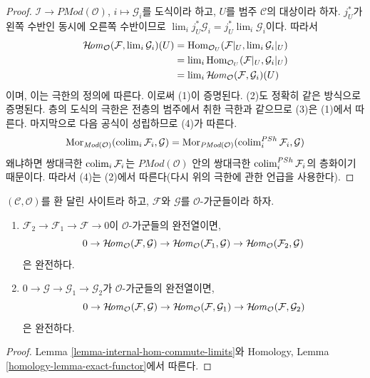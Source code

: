 \begin{proof}
$\mathcal{I} \to \textit{PMod}(\mathcal{O})$, $i \mapsto \mathcal{G}_i$를
도식이라 하고, $U$를 범주 $\mathcal{C}$의 대상이라 하자. $j_U^*$가 왼쪽
수반인 동시에 오른쪽 수반이므로
$\lim_i j_U^*\mathcal{G}_i = j_U^* \lim_i \mathcal{G}_i$이다. 따라서
\begin{align*}
\mathop{\mathcal{H}\!\mathit{om}}\nolimits_\mathcal{O}(\mathcal{F}, \mathop{\mathrm{lim}}\nolimits_i \mathcal{G}_i)(U)
& =
\mathop{\mathrm{Hom}}\nolimits_{\mathcal{O}_U}(\mathcal{F}|_U, \mathop{\mathrm{lim}}\nolimits_i \mathcal{G}_i|_U) \\
& =
\mathop{\mathrm{lim}}\nolimits_i \mathop{\mathrm{Hom}}\nolimits_{\mathcal{O}_U}(\mathcal{F}|_U, \mathcal{G}_i|_U) \\
& = \mathop{\mathrm{lim}}\nolimits_i \mathop{\mathcal{H}\!\mathit{om}}\nolimits_\mathcal{O}(\mathcal{F}, \mathcal{G}_i)(U)
\end{align*}
이며, 이는 극한의 정의에 따른다. 이로써 (1)이 증명된다. (2)도 정확히 같은
방식으로 증명된다. 층의 도식의 극한은 전층의 범주에서 취한 극한과 같으므로
(3)은 (1)에서 따른다. 마지막으로 다음 공식이 성립하므로 (4)가 따른다.
$$
\mathop{\mathrm{Mor}}\nolimits_{\textit{Mod}(\mathcal{O})}(
\mathop{\mathrm{colim}}\nolimits_i \mathcal{F}_i, \mathcal{G})
=
\mathop{\mathrm{Mor}}\nolimits_{\textit{PMod}(\mathcal{O})}(
\mathop{\mathrm{colim}}\nolimits^{PSh}_i \mathcal{F}_i, \mathcal{G})
$$
왜냐하면 쌍대극한 $\mathop{\mathrm{colim}}\nolimits_i \mathcal{F}_i$는
$\textit{PMod}(\mathcal{O})$ 안의 쌍대극한
$\mathop{\mathrm{colim}}\nolimits^{PSh}_i \mathcal{F}_i$의 층화이기 때문이다. 따라서 (4)는 (2)에서
따른다(다시 위의 극한에 관한 언급을 사용한다).
\end{proof}

\begin{lemma}
\label{lemma-internal-hom-exact}
$(\mathcal{C}, \mathcal{O})$를 환 달린 사이트라 하고,
$\mathcal{F}$와 $\mathcal{G}$를 $\mathcal{O}$-가군들이라 하자.
\begin{enumerate}
\item $\mathcal{F}_2 \to \mathcal{F}_1 \to \mathcal{F} \to 0$이
$\mathcal{O}$-가군들의 완전열이면,
$$
0 \to
\mathop{\mathcal{H}\!\mathit{om}}\nolimits_\mathcal{O}(\mathcal{F}, \mathcal{G}) \to
\mathop{\mathcal{H}\!\mathit{om}}\nolimits_\mathcal{O}(\mathcal{F}_1, \mathcal{G}) \to
\mathop{\mathcal{H}\!\mathit{om}}\nolimits_\mathcal{O}(\mathcal{F}_2, \mathcal{G})
$$
은 완전하다.
\item $0 \to \mathcal{G} \to \mathcal{G}_1 \to \mathcal{G}_2$가
$\mathcal{O}$-가군들의 완전열이면,
$$
0 \to
\mathop{\mathcal{H}\!\mathit{om}}\nolimits_\mathcal{O}(\mathcal{F}, \mathcal{G}) \to
\mathop{\mathcal{H}\!\mathit{om}}\nolimits_\mathcal{O}(\mathcal{F}, \mathcal{G}_1) \to
\mathop{\mathcal{H}\!\mathit{om}}\nolimits_\mathcal{O}(\mathcal{F}, \mathcal{G}_2)
$$
은 완전하다.
\end{enumerate}
\end{lemma}

\begin{proof}
Lemma \ref{lemma-internal-hom-commute-limits}와 Homology, Lemma
\ref{homology-lemma-exact-functor}에서 따른다.
\end{proof}

